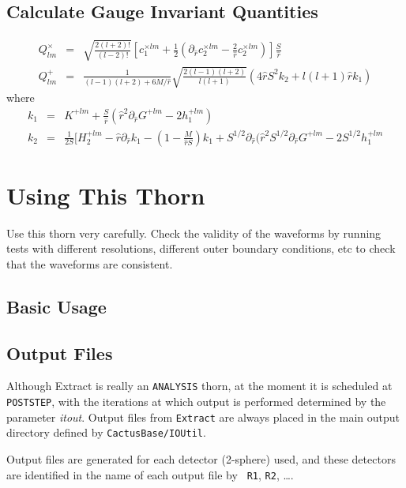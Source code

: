 \subsection{Calculate Gauge Invariant Quantities}

\begin{eqnarray}
Q^{\times}_{lm} 
  & = & \sqrt{\frac{2(l+2)!}{(l-2)!}}\left[c_1^{\times lm}
        + \frac{1}{2}\left(\partial_{\hat{r}} c_2^{\times lm} - \frac{2}{\hat{r}}
        c_2^{\times lm}\right)\right] \frac{S}{\hat{r}}
\\
Q^{+}_{lm}
  & = & \frac{1}{(l-1)(l+2)+6M/\hat{r}}\sqrt{\frac{2(l-1)(l+2)}{l(l+1)}}
        (4\hat{r}S^2 k_2+l(l+1)\hat{r} k_1) 
\end{eqnarray}
where
\begin{eqnarray}
k_1 & = & K^{+lm} + \frac{S}{\hat{r}}(\hat{r}^2\partial_{\hat{r}} G^{+lm} - 2h^{+lm}_1) \\
k_2 & = & \frac{1}{2S}
          [H^{+lm}_2-\hat{r}\partial_{\hat{r}} k_1-(1-\frac{M}{\hat{r}S}) k_1 + S^{1/2}\partial_{\hat{r}}
          (\hat{r}^2 S^{1/2} \partial_{\hat{r}} G^{+lm}-2S^{1/2}h_1^{+lm}
\end{eqnarray}

\section{Using This Thorn}

Use this thorn very carefully. Check the validity of the waveforms by running
tests with different resolutions, different outer boundary conditions, etc
to check that the waveforms are consistent.

\subsection{Basic Usage}

\subsection{Output Files}

Although Extract is really an {\tt ANALYSIS} thorn, at the moment it
is scheduled at {\tt POSTSTEP}, with the iterations at which output is
performed determined by the parameter {\it itout}. Output files from
{\tt Extract} are always placed in the main output directory defined
by {\tt CactusBase/IOUtil}.

Output files are generated for each detector (2-sphere) used, and
these detectors are identified in the name of each output file by {\tt
R1}, {\tt R2}, \ldots.

